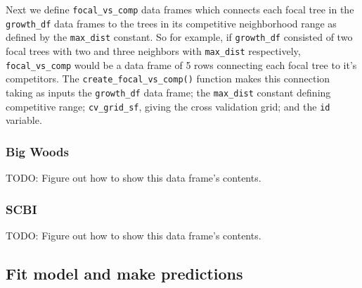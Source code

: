\documentclass[12pt]{article}
\newenvironment{Shaded}{\begin{snugshade}}{\end{snugshade}}
\newcommand{\DataTypeTok}[1]{\textcolor[rgb]{0.13,0.29,0.53}{#1}}
\newcommand{\KeywordTok}[1]{\textcolor[rgb]{0.13,0.29,0.53}{\textbf{#1}}}
\newcommand{\NormalTok}[1]{#1}
\newcommand{\OperatorTok}[1]{\textcolor[rgb]{0.81,0.36,0.00}{\textbf{#1}}}
\newcommand{\StringTok}[1]{\textcolor[rgb]{0.31,0.60,0.02}{#1}}
\begin{document}
Next we define \texttt{focal\_vs\_comp} data frames which connects each
focal tree in the \texttt{growth\_df} data frames to the trees in its
competitive neighborhood range as defined by the \texttt{max\_dist}
constant. So for example, if \texttt{growth\_df} consisted of two focal
trees with two and three neighbors with \texttt{max\_dist} respectively,
\texttt{focal\_vs\_comp} would be a data frame of 5 rows connecting each
focal tree to it's competitors. The \texttt{create\_focal\_vs\_comp()}
function makes this connection taking as inputs the \texttt{growth\_df}
data frame; the \texttt{max\_dist} constant defining competitive range;
\texttt{cv\_grid\_sf}, giving the cross validation grid; and the
\texttt{id} variable.

\hypertarget{big-woods-3}{%
\subsubsection{Big Woods}\label{big-woods-3}}

\begin{Shaded}
\end{Shaded}

TODO: Figure out how to show this data frame's contents.

\hypertarget{scbi-2}{%
\subsubsection{SCBI}\label{scbi-2}}

\begin{Shaded}
\end{Shaded}

TODO: Figure out how to show this data frame's contents.

\hypertarget{model-fit-predict}{%
\subsection{Fit model and make predictions}\label{model-fit-predict}}
\end{document}
